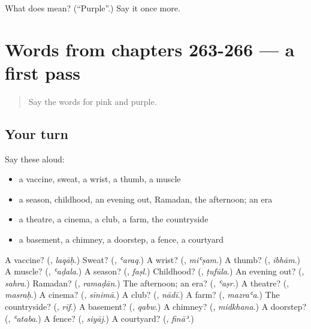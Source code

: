 \begin{tcolorbox}[breakable,colback=teal!4,colframe=teal!35!black,title={Before you move on}]
What does  mean? (\textquotedblleft{}Purple\textquotedblright{}.) Say it once more.
\end{tcolorbox}
\section[(dialogue)]{Words from chapters 263-266 — a first pass}

\label{lesson:AR-R271-first-pass-words-from-chapters-263-266}



\begin{quote}
Say the words for pink and purple.
\end{quote}

\subsection*{Your turn}
Say these aloud:

\begin{itemize}
\raggedright
  \item a vaccine, sweat, a wrist, a thumb, a muscle
  \item a season, childhood, an evening out, Ramadan, the afternoon; an era
  \item a theatre, a cinema, a club, a farm, the countryside
  \item a basement, a chimney, a doorstep, a fence, a courtyard
\end{itemize}

\begin{tcolorbox}[breakable,colback=teal!4,colframe=teal!35!black,title={Before you move on}]
A vaccine? (\textbf{}, \emph{laqāḥ}.) Sweat? (\textbf{}, \emph{ʿaraq}.) A wrist? (\textbf{}, \emph{miʿṣam}.) A thumb? (\textbf{}, \emph{ibhām}.) A muscle? (\textbf{}, \emph{ʿaḍala}.) A season? (\textbf{}, \emph{faṣl}.) Childhood? (\textbf{}, \emph{ṭufūla}.) An evening out? (\textbf{}, \emph{sahra}.) Ramadan? (\textbf{}, \emph{ramaḍān}.) The afternoon; an era? (\textbf{}, \emph{ʿaṣr}.) A theatre? (\textbf{}, \emph{masraḥ}.) A cinema? (\textbf{}, \emph{sīnimā}.) A club? (\textbf{}, \emph{nādī}.) A farm? (\textbf{}, \emph{mazraʿa}.) The countryside? (\textbf{}, \emph{rīf}.) A basement? (\textbf{}, \emph{qabw}.) A chimney? (\textbf{}, \emph{midkhana}.) A doorstep? (\textbf{}, \emph{ʿataba}.) A fence? (\textbf{}, \emph{siyāj}.) A courtyard? (\textbf{}, \emph{fināʾ}.)
\end{tcolorbox}
